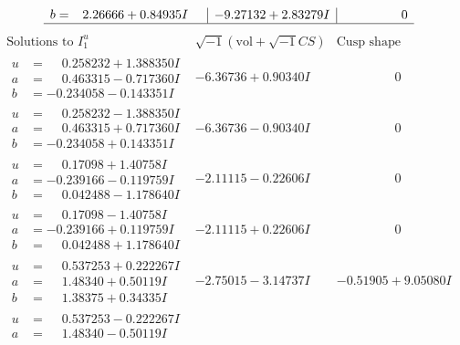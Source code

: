 \documentclass[1p]{elsarticle_modified}
\theoremstyle{definition}
\newcommand{\I}{\sqrt{-1}}
\begin{document}
$$\begin{array}{c|c|c}
\begin{aligned}
b &= \phantom{-}2.26666 + 0.84935 I\end{aligned}
 & -9.27132 + 2.83279 I & \phantom{-0.000000 } 0\\
 \hline 
 \end{array}$$\newpage$$\begin{array}{c|c|c}  
\text{Solutions to }I^u_{1}& \I (\text{vol} + \sqrt{-1}CS) & \text{Cusp shape}\\
 \hline 
\begin{aligned}
u &= \phantom{-}0.258232 + 1.388350 I \\
a &= \phantom{-}0.463315 - 0.717360 I \\
b &= -0.234058 - 0.143351 I\end{aligned}
 & -6.36736 + 0.90340 I & \phantom{-0.000000 } 0 \\ \hline\begin{aligned}
u &= \phantom{-}0.258232 - 1.388350 I \\
a &= \phantom{-}0.463315 + 0.717360 I \\
b &= -0.234058 + 0.143351 I\end{aligned}
 & -6.36736 - 0.90340 I & \phantom{-0.000000 } 0 \\ \hline\begin{aligned}
u &= \phantom{-}0.17098 + 1.40758 I \\
a &= -0.239166 - 0.119759 I \\
b &= \phantom{-}0.042488 - 1.178640 I\end{aligned}
 & -2.11115 - 0.22606 I & \phantom{-0.000000 } 0 \\ \hline\begin{aligned}
u &= \phantom{-}0.17098 - 1.40758 I \\
a &= -0.239166 + 0.119759 I \\
b &= \phantom{-}0.042488 + 1.178640 I\end{aligned}
 & -2.11115 + 0.22606 I & \phantom{-0.000000 } 0 \\ \hline\begin{aligned}
u &= \phantom{-}0.537253 + 0.222267 I \\
a &= \phantom{-}1.48340 + 0.50119 I \\
b &= \phantom{-}1.38375 + 0.34335 I\end{aligned}
 & -2.75015 - 3.14737 I & -0.51905 + 9.05080 I \\ \hline\begin{aligned}
u &= \phantom{-}0.537253 - 0.222267 I \\
a &= \phantom{-}1.48340 - 0.50119 I \\

\end{aligned}
\end{array}$$
\end{document}
